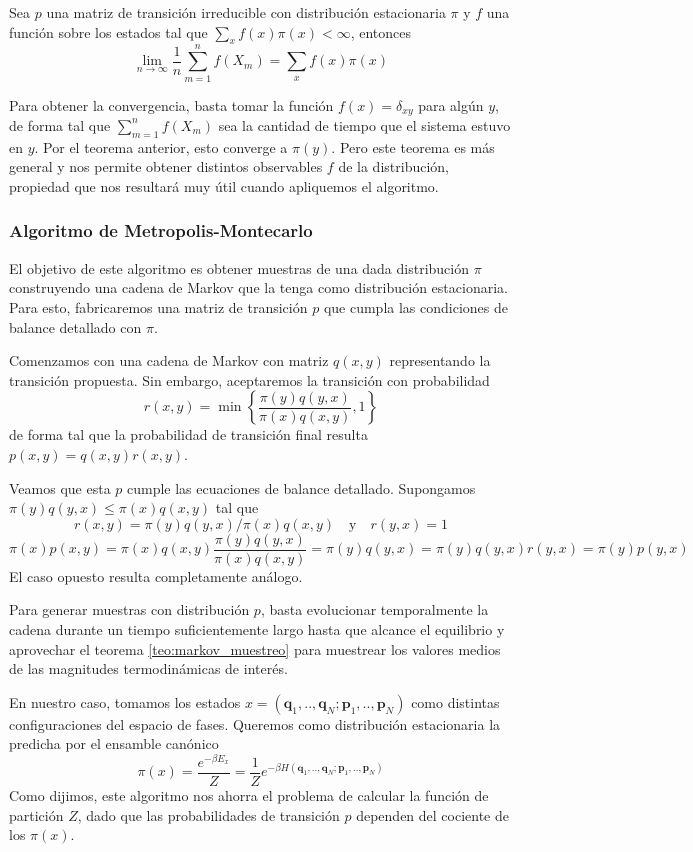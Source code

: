 \begin{theorem}{\label{teo:markov_muestreo}}
 Sea $p$ una matriz de transición irreducible con distribución estacionaria $\pi$ y $f$ una función sobre los estados tal que $\sum_x f(x)\pi(x) < \infty$, entonces
 \[ \lim_{n\to\infty} \frac{1}{n} \sum_{m=1}^n f(X_m) = \sum_x f(x)\pi(x) \]
\end{theorem}

Para obtener la convergencia, basta tomar la función $f(x) = \delta_{xy}$ para algún $y$, de forma tal que $\sum_{m=1}^n f(X_m)$ sea la cantidad de tiempo que el sistema estuvo en $y$.
Por el teorema anterior, esto converge a $\pi(y)$.
Pero este teorema es más general y nos permite obtener distintos observables $f$ de la distribución, propiedad que nos resultará muy útil cuando apliquemos el algoritmo.


\subsubsection{Algoritmo de Metropolis-Montecarlo}{\label{sec:alg_mm}}

El objetivo de este algoritmo es obtener muestras de una dada distribución $\pi$ construyendo una cadena de Markov que la tenga como distribución estacionaria.
Para esto, fabricaremos una matriz de transición $p$ que cumpla las condiciones de balance detallado con $\pi$.

Comenzamos con una cadena de Markov con matriz $q(x,y)$ representando la transición propuesta.
Sin embargo, aceptaremos la transición con probabilidad\cite{Metropolis1953}
\[r(x,y) = \min \left\{ \frac{\pi(y)q(y,x)}{\pi(x)q(x,y)}, 1\right\}\]
de forma tal que la probabilidad de transición final resulta $p(x,y) = q(x,y)r(x,y)$.

Veamos que esta $p$ cumple las ecuaciones de balance detallado.
Supongamos $\pi(y)q(y,x) \leq \pi(x)q(x,y)$ tal que 
\[
r(x,y) = \pi(y)q(y,x)/\pi(x)q(x,y) \quad \text{y} \quad r(y,x) = 1\]
\[ \pi(x) p(x, y) = \pi(x) q(x,y)\frac{\pi(y)q(y,x)}{\pi(x)q(x,y)} = \pi(y)q(y,x) = \pi(y)q(y,x)r(y,x) = \pi(y)p(y,x) \]
El caso opuesto resulta completamente análogo.

Para generar muestras con distribución $p$, basta evolucionar temporalmente la cadena durante un tiempo suficientemente largo hasta que alcance el equilibrio y
aprovechar el teorema \ref{teo:markov_muestreo} para muestrear los valores medios de las magnitudes termodinámicas de interés.

En nuestro caso, tomamos los estados $x = (\mathbf{q}_1,..,\mathbf{q}_N;\mathbf{p}_1,..,\mathbf{p}_N)$ como distintas configuraciones del espacio de fases.
Queremos como distribución estacionaria la predicha por el ensamble canónico \[\pi(x) = \frac{e^{-\beta E_x}}{Z} = \frac{1}{Z}e^{-\beta H(\mathbf{q}_1,..,\mathbf{q}_N;\mathbf{p}_1,..,\mathbf{p}_N)}\]
Como dijimos, este algoritmo nos ahorra el problema de calcular la función de partición $Z$, dado que las probabilidades de transición $p$ dependen del cociente de los $\pi(x)$.

